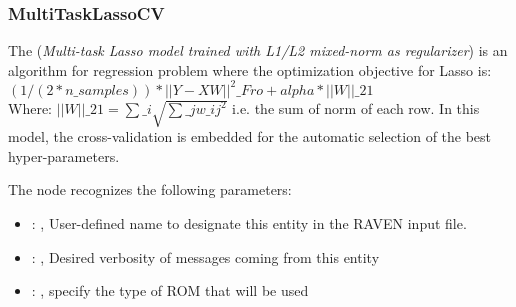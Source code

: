 \subsubsection{MultiTaskLassoCV}
  The  (\textit{Multi-task Lasso model trained
  with L1/L2 mixed-norm as regularizer}) is an algorithm for regression problem
  where the optimization objective for Lasso is:                         $(1 / (2 * n\_samples)) *
  ||Y - XW||^2\_{Fro} + alpha * ||W||\_{21}$                         \\Where:
  $||W||\_{21} = \sum\_i \sqrt{\sum\_j w\_{ij}^2}$                         i.e. the sum of norm of each
  row.                         In this model, the cross-validation is embedded for the automatic
  selection                         of the best hyper-parameters.

  The  node recognizes the following parameters:
    \begin{itemize}
      \item {}: , 
        User-defined name to designate this entity in the RAVEN input file.
      \item {}: , 
        Desired verbosity of messages coming from this entity
      \item {}: , 
        specify the type of ROM that will be used
  \end{itemize}

